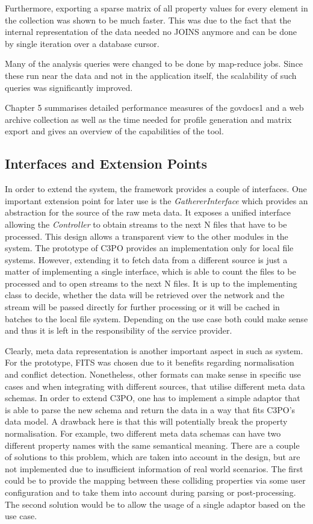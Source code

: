Furthermore, exporting a sparse matrix of all property values for every element in the collection was shown to be much faster. This was due to the fact that the internal representation of the data needed no JOINS anymore and can be done by single iteration over a database cursor.

Many of the analysis queries were changed to be done by map-reduce jobs. Since these run near the data and not in the application itself, the scalability of such queries was significantly improved.

Chapter 5 summarises detailed performance measures of the govdocs1 and a web archive collection as well as the time needed for profile generation and matrix export and gives an overview of the capabilities of the tool.

\subsection{Interfaces and Extension Points}
In order to extend the system, the framework provides a couple of interfaces. One important extension point for later use is the \textit{GathererInterface} which provides an abstraction for the source of the raw meta data. It exposes a unified interface allowing the \textit{Controller} to obtain streams to the next N files that have to be processed. This design allows a transparent view to the other modules in the system. The prototype of C3PO provides an implementation only for local file systems. However, extending it to fetch data from a different source is just a matter of implementing a single interface, which is able to count the files to be processed and to open streams to the next N files. It is up to the implementing class to decide, whether the data will be retrieved over the network and the stream will be passed directly for further processing or it will be cached in batches to the local file system. Depending on the use case both could make sense and thus it is left in the responsibility of the service provider.

Clearly, meta data representation is another important aspect in such as system. For the prototype, FITS was chosen due to it benefits regarding normalisation and conflict detection. Nonetheless, other formats can make sense in specific use cases and when integrating with different sources, that utilise different meta data schemas. In order to extend C3PO, one has to implement a simple adaptor that is able to parse the new schema and return the data in a way that fits C3PO's data model. A drawback here is that this will potentially break the property normalisation. For example, two different meta data schemas can have two different property names with the same semantical meaning. There are a couple of solutions to this problem, which are taken into account in the design, but are not implemented due to insufficient information of real world scenarios. The first could be to provide the mapping between these colliding properties via some user configuration and to take them into account during parsing or post-processing. The second solution would be to allow the usage of a single adaptor based on the use case.

